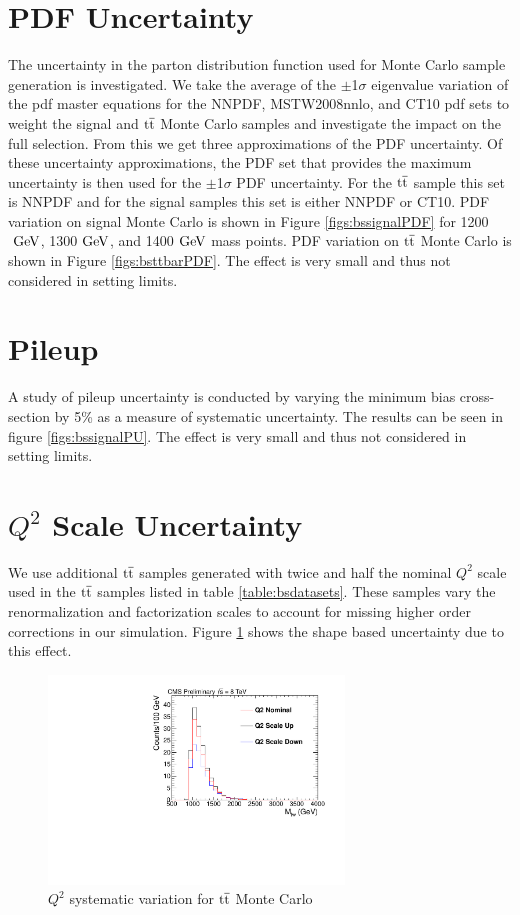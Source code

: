 \section{PDF Uncertainty}
The uncertainty in the parton distribution function used for Monte Carlo sample generation is investigated.  We take the average of the $\pm$1$\sigma$ eigenvalue 
variation of the pdf master equations \cite{Bourilkov:2006cj} 
for the NNPDF, MSTW2008nnlo, and CT10 pdf sets to weight the signal and $\mathrm{t\overline{t}}$ Monte Carlo samples and investigate the impact on the full selection.  From this we get three 
approximations of the PDF uncertainty. 
Of these uncertainty approximations, the PDF set that provides the maximum uncertainty is then used for the $\pm$1$\sigma$ PDF uncertainty.  For the $\mathrm{t\overline{t}}$ sample this set is NNPDF and for the signal samples this set is either NNPDF or CT10. PDF 
variation on signal Monte Carlo is shown in Figure \ref{figs:bssignalPDF} for 1200$~\mathrm{GeV}$,
 1300$~\mathrm{GeV}$, and 1400$~\mathrm{GeV}$ mass points.  PDF variation on $\mathrm{t\overline{t}}$ Monte Carlo is shown in Figure \ref{figs:bsttbarPDF}.  The effect is very small and thus not considered in setting limits.

\section{Pileup}
A study of pileup uncertainty is conducted by varying the minimum bias cross-section by 5\% as a measure of systematic uncertainty.  The results 
can be seen in figure \ref{figs:bssignalPU}.  The effect is very small and thus not considered in setting limits.

\section{$Q^2$ Scale Uncertainty}
We use additional $\mathrm{t\overline{t}}$ samples generated with twice and half the nominal $Q^2$ 
scale used in the $\mathrm{t\overline{t}}$ samples listed in table \ref{table:bsdatasets}.  These samples vary the renormalization and factorization scales to account for 
missing higher order corrections in our simulation.  Figure \ref{figs:bsq2scale} shows the shape based uncertainty due to this effect.

\begin{figure}[htcb]
\begin{center}
\includegraphics[width=0.7\textwidth]{AN-14-049/figs/TTbar_Q2Scale}
\caption{
$Q^2$ systematic variation for $\mathrm{t\overline{t}}$ Monte Carlo 
}
\label{figs:bsq2scale}
\end{center}
\end{figure}


